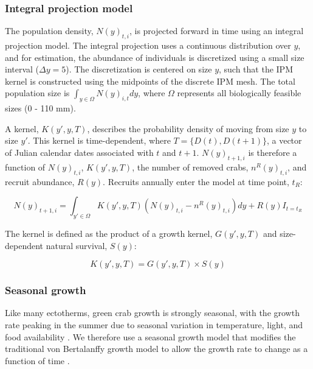 \documentclass{article}
\begin{document}
\subsubsection*{Integral projection model}

The population density, $N(y)_{t,i}$, is projected forward in time using an integral projection model. The integral projection uses a continuous distribution over $y$, and for estimation, the abundance of individuals is discretized using a small size interval ($\Delta y = 5$). The discretization is centered on size $y$, such that the IPM kernel is constructed using the midpoints of the discrete IPM mesh. The total population size is $\int_{y \in \Omega} N(y)_{i,t}dy$, where $\Omega$ represents all biologically feasible sizes (0 - 110 mm).

A kernel, $K(y', y, T)$, describes the probability density of moving from size $y$ to size $y'$. This kernel is time-dependent, where $T = \{D(t), D(t+1)\}$, a vector of Julian calendar dates associated with $t$ and $t+1$. $N(y)_{t+1,i}$ is therefore a function of $N(y)_{t,i}$, $K(y', y, T)$, the number of removed crabs, $n^R(y)_{t,i}$, and recruit abundance, $R(y)$. Recruits annually enter the model at time point, $t_R$:

\begin{equation}
N(y)_{t+1,i} = \int_{y' \in \Omega} K(y',y, T) (N(y)_{t,i} - n^R(y)_{t,i}) dy + R(y)I_{t = t_R}
\end{equation}

The kernel is defined as the product of a growth kernel, $G(y',y, T)$ and size-dependent natural survival, $S(y)$:

\begin{equation}
K(y',y, T) = G(y',y, T) \times S(y)
\end{equation}

\subsubsection*{Seasonal growth}

Like many ectotherms, green crab growth is strongly seasonal, with the growth rate peaking in the summer due to seasonal variation in temperature, light, and food availability \parencite{contreras2003population, garcia2012technical}. We therefore use a seasonal growth model that modifies the traditional von Bertalanffy growth model to allow the growth rate to change as a function of time \parencite{beverton2012dynamics, somers1988seasonally}.
\end{document}
